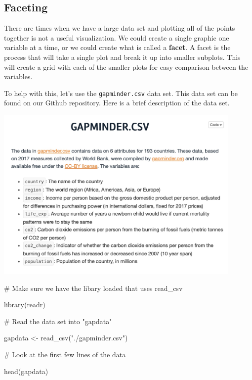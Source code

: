 \documentclass[
  letterpaper,
  DIV=11,
  numbers=noendperiod]{scrreprt}
\newenvironment{Shaded}{\begin{snugshade}}{\end{snugshade}}
\newcommand{\CommentTok}[1]{\textcolor[rgb]{0.37,0.37,0.37}{#1}}
\newcommand{\FunctionTok}[1]{\textcolor[rgb]{0.28,0.35,0.67}{#1}}
\newcommand{\NormalTok}[1]{\textcolor[rgb]{0.00,0.23,0.31}{#1}}
\newcommand{\OtherTok}[1]{\textcolor[rgb]{0.00,0.23,0.31}{#1}}
\newcommand{\StringTok}[1]{\textcolor[rgb]{0.13,0.47,0.30}{#1}}
\begin{document}
\subsection*{Faceting}\label{faceting}

There are times when we have a large data set and plotting all of the
points together is not a useful visualization. We could create a single
graphic one variable at a time, or we could create what is called a
\textbf{facet}. A facet is the process that will take a single plot and
break it up into smaller subplots. This will create a grid with each of
the smaller plots for easy comparison between the variables.

To help with this, let's use the \texttt{gapminder.csv} data set. This
data set can be found on our Github repository. Here is a brief
description of the data set.

\includegraphics[width=0.9\textwidth,height=\textheight]{./images/AST_3.jpg}

\begin{Shaded}
\begin{Highlighting}[]
\CommentTok{\# Make sure we have the libary loaded that uses read\_csv}

\FunctionTok{library}\NormalTok{(readr)}

\CommentTok{\# Read the data set into "gapdata"}

\NormalTok{gapdata }\OtherTok{\textless{}{-}} \FunctionTok{read\_csv}\NormalTok{(}\StringTok{"./gapminder.csv"}\NormalTok{)}

\CommentTok{\# Look at the first few lines of the data}

\FunctionTok{head}\NormalTok{(gapdata)}
\end{Highlighting}
\end{Shaded}
\end{document}
